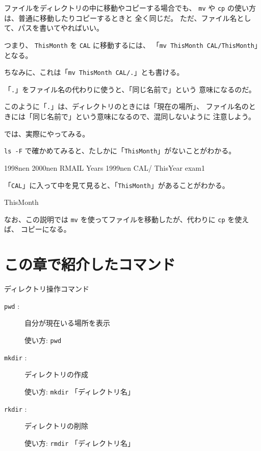 ファイルをディレクトリの中に移動やコピーする場合でも、
 \texttt{mv} や \texttt{cp} の使い方は、普通に移動したりコピーするときと
全く同じだ。
ただ、ファイル名として、パスを書いてやればいい。

つまり、 \texttt{ThisMonth} を \texttt{CAL} に移動するには、
「\texttt{mv ThisMonth CAL/ThisMonth}」となる。

ちなみに、これは「\texttt{mv ThisMonth CAL/.}」とも書ける。

「\texttt{.}」をファイル名の代わりに使うと、「同じ名前で」という
意味になるのだ。

このように「\texttt{.}」は、ディレクトリのときには「現在の場所」、
ファイル名のときには「同じ名前で」という意味になるので、混同しないように
注意しよう。

\bigskip

では、実際にやってみる。

\begin{progls}
%
\end{progls}

\texttt{ls -F} で確かめてみると、たしかに「\texttt{ThisMonth}」がないことがわかる。
\begin{progls}
1998nen         2000nen         RMAIL           Years
1999nen         CAL/            ThisYear        exam1
%
\end{progls}

「\texttt{CAL}」に入って中を見て見ると、「\texttt{ThisMonth}」があることがわかる。
\begin{progls}
ThisMonth
%
\end{progls}

なお、この説明では \texttt{mv} を使ってファイルを移動したが、代わりに \texttt{cp} を使えば、
コピーになる。

\section*{この章で紹介したコマンド}

\begin{center}
\begin{minipage}{13cm}
\begin{itembox}[l]{ディレクトリ操作コマンド}
\begin{description}
\item[\texttt{pwd} :] 自分が現在いる場所を表示

使い方: \texttt{pwd}
\item[\texttt{mkdir} :] ディレクトリの作成

使い方: \texttt{mkdir} 「ディレクトリ名」
\item[\texttt{rkdir} :] ディレクトリの削除

使い方: \texttt{rmdir} 「ディレクトリ名」
\end{description}
\end{itembox}
\end{minipage}
\end{center}
